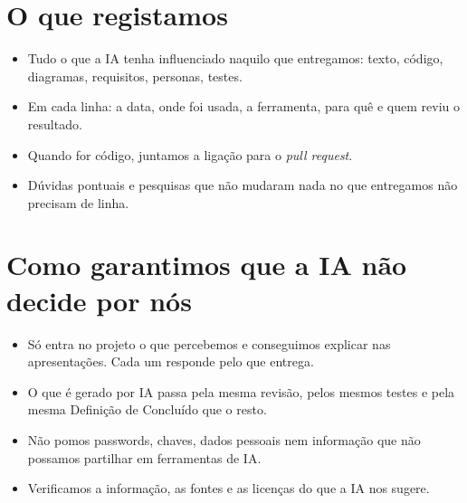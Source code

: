 \documentclass[11pt,a4paper]{article}
\begin{document}
\section{O que registamos}

\begin{itemize}
  \item Tudo o que a IA tenha influenciado naquilo que entregamos: texto, código, diagramas, requisitos, personas, testes.
  \item Em cada linha: a data, onde foi usada, a ferramenta, para quê e quem reviu o resultado.
  \item Quando for código, juntamos a ligação para o \textit{pull request}.
  \item Dúvidas pontuais e pesquisas que não mudaram nada no que entregamos não precisam de linha.
\end{itemize}

\section{Como garantimos que a IA não decide por nós}

\begin{itemize}
  \item Só entra no projeto o que percebemos e conseguimos explicar nas apresentações. Cada um responde pelo que entrega.
  \item O que é gerado por IA passa pela mesma revisão, pelos mesmos testes e pela mesma Definição de Concluído que o resto.
  \item Não pomos passwords, chaves, dados pessoais nem informação que não possamos partilhar em ferramentas de IA.
  \item Verificamos a informação, as fontes e as licenças do que a IA nos sugere.
\end{itemize}
\end{document}
